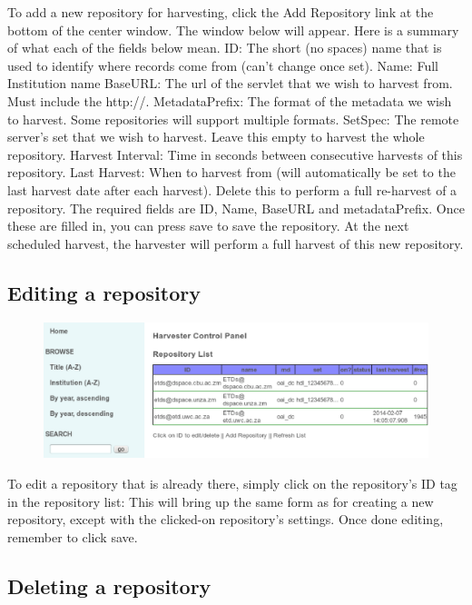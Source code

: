 \documentclass[a4paper,11pt]{article}
\begin{document}
To add a new repository for harvesting, click the Add Repository link at the bottom of the center window. The window below will appear. Here is a summary of what each of the fields below mean.
ID: The short (no spaces) name that is used to identify where records come from (can't change once set). Name: Full Institution name BaseURL: The url of the servlet that we wish to harvest from. Must include the http://. MetadataPrefix: The format of the metadata we wish to harvest. Some repositories will support multiple formats. SetSpec: The remote server's set that we wish to harvest. Leave this empty to harvest the whole repository. Harvest Interval: Time in seconds between consecutive harvests of this repository. Last Harvest: When to harvest from (will automatically be set to the last harvest date after each harvest). Delete this to perform a full re-harvest of a repository.
The required fields are ID, Name, BaseURL and metadataPrefix. Once these are filled in, you can press save to save the repository. At the next scheduled harvest, the harvester will perform a full harvest of this new repository.

\subsection{Editing a repository}

\begin{figure}[h]
 \centering
 \includegraphics[width=\textwidth]{editing_repository_infomation_x.eps}
\end{figure}

To edit a repository that is already there, simply click on the repository's ID tag in the repository list:
This will bring up the same form as for creating a new repository, except with the clicked-on repository's settings. Once done editing, remember to click save.

\subsection{Deleting a repository}
\end{document}
